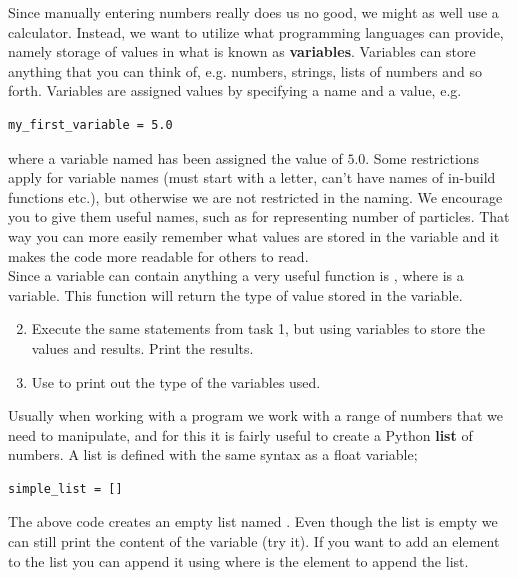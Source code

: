 \documentclass{article}
\begin{document}
Since manually entering numbers really does us no good, we might as well use a
calculator. Instead, we want to utilize what programming languages can provide,
namely storage of values in what is known as {\bf variables}. Variables can store
anything that you can think of, e.g. numbers, strings, lists of numbers and so
forth. Variables are assigned values by specifying a name and a value, e.g.

\begin{lstlisting}
my_first_variable = 5.0
\end{lstlisting}

where a variable named  has been assigned the value
of $5.0$.
Some restrictions apply for variable names (must start with a letter, can't have names of
in-build functions etc.), but otherwise we are not restricted in the naming. We encourage you to give
them useful names, such as  for representing number of
particles. That way you can more easily remember what values are stored in the variable
and it makes the code more readable for others to read.\\

Since a variable can contain anything a very useful function is ,
where  is a variable. This function will return the type of value stored
in the variable.

\begin{enumerate}
  \setcounter{enumi}{1}
  \item Execute the same statements from task 1, but using variables to store
    the values and results. Print the results.
  \item Use  to print out the type of the variables used.
\end{enumerate}

Usually when working with a program we work with a range of numbers
that we need to manipulate, and for this it is fairly useful to create a Python {\bf list}
of numbers.
A list is defined with the same syntax as a float variable;

\begin{lstlisting}
simple_list = []
\end{lstlisting}

The above code creates an empty list named .
Even though the list is empty we can still print
the content of the variable (try it).
If you want to add an element to the list you can
append it using  where  is the element to append the list.
\end{document}
